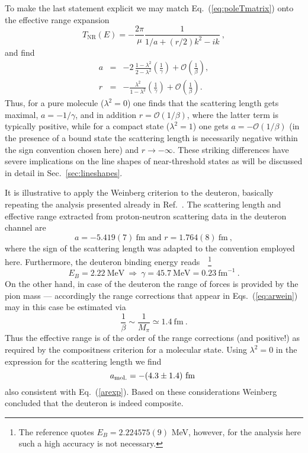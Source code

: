  To make the last statement explicit we may match Eq.~(\ref{eq:poleTmatrix})
 onto the effective range expansion
 \begin{equation}
 T_\text{NR}(E)=- \frac{2\pi}{\mu} \frac{1}{1/a + (r/2)k^2-ik} \ ,
 \label{eq:ere}
 \end{equation}
 and find
 \begin{eqnarray} \nonumber
 a &=& - 2\, \frac{1-\lambda^2}{2-\lambda^2}\left(\frac1{\gamma}\right)+
 {\mathcal O}\left(\frac1\beta\right) , \\
  r&=& -\frac{\lambda^2}{1-\lambda^2} \left(\frac1{\gamma}\right)+ {\mathcal
  O}\left(\frac1\beta\right) .
  \label{eq:arwein}
 \end{eqnarray}
 Thus, for a pure molecule ($\lambda^2=0$) one finds that the scattering
 length gets maximal, $a=-1/\gamma$, and in addition $r={\mathcal O}(1/\beta)$,
 where the latter term is typically positive, while for a compact state 
 ($\lambda^2=1$) one gets $a=-{\mathcal O}(1/\beta)$ (in the presence of a bound
 state the scattering length is necessarily negative within the sign convention 
 chosen here) and $r\to -\infty$.
 These striking differences have severe implications on the line shapes of
 near-threshold states as will be discussed in detail in 
 Sec.~\ref{sec:lineshapes}.
 
 It is illustrative to apply the Weinberg criterion to the deuteron, 
 basically repeating the analysis presented already in Ref.~\cite{Weinberg:1965zz}.
 The scattering length and effective range
 extracted from proton-neutron scattering data in the deuteron channel
 are~\cite{Klarsfeld:1984es}
 \begin{equation}
a = -5.419(7) \ \mbox{fm \ and \ } r=1.764(8) \ \mbox{fm} \ ,
\label{arexp}
\end{equation}
where the sign of the scattering length was adapted to the convention employed here.
Furthermore, the deuteron binding energy reads~\cite{VanDerLeun:1982bhg}~\footnote{The
reference quotes $E_B=2.224575(9)$ MeV, however, for the analysis here such a high accuracy is
not necessary.}
  \begin{equation}
E_B= 2.22 \ \mbox{MeV} \ \Longrightarrow \ \gamma=45.7 \ \mbox{MeV} = 0.23 \ \mbox{fm}^{-1} \ .
\end{equation}
On the other hand, in case of the deuteron the range of forces is
provided by the pion mass --- accordingly the range corrections
that appear in Eqs.~(\ref{eq:arwein}) may in this case be estimated via
\begin{equation}
\frac1{\beta}\sim \frac1{M_\pi}\simeq 1.4 \ \mbox{fm} \ .
\end{equation}
Thus the effective range is of the order of the range corrections (and positive!)
 as required by the compositness criterion for a molecular state.
Using $\lambda^2=0$ in the expression for the scattering length we find
\begin{equation}
a_{\rm mol.} = -(4.3\pm 1.4) \ \mbox{fm} \ 
\end{equation}
also consistent with Eq.~(\ref{arexp}). Based on these considerations Weinberg
concluded that the deuteron is indeed composite.
 
